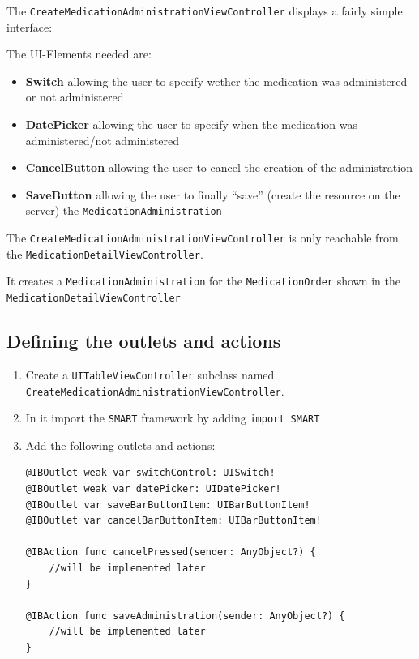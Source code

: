 \documentclass{article}
\begin{document}
The \texttt{CreateMedicationAdministrationViewController} displays a
fairly simple interface:

The UI-Elements needed are:
\begin{itemize}
  \item
    \textbf{Switch} allowing the user to specify wether the medication was administered or not administered
  \item
    \textbf{DatePicker} allowing the user to specify when the medication was administered/not administered
  \item
  \textbf{CancelButton} allowing the user to cancel the creation of the administration
  \item
    \textbf{SaveButton} allowing the user to finally ``save'' (create the resource on the server) the \texttt{MedicationAdministration}
\end{itemize}

The \texttt{CreateMedicationAdministrationViewController} is only
reachable from the \texttt{MedicationDetailViewController}.

It creates a \texttt{MedicationAdministration} for the \texttt{MedicationOrder} shown in the \texttt{MedicationDetailViewController}

\subsection{Defining the outlets and actions}\label{defining-the-outlets-and-actions}

\begin{enumerate}
\item
  Create a \texttt{UITableViewController} subclass named \texttt{CreateMedicationAdministrationViewController}.
\item
  In it import the \texttt{SMART} framework by adding \texttt{import\ SMART}
\item
Add the following outlets and actions:
\begin{verbatim}
@IBOutlet weak var switchControl: UISwitch!
@IBOutlet weak var datePicker: UIDatePicker!
@IBOutlet var saveBarButtonItem: UIBarButtonItem!
@IBOutlet var cancelBarButtonItem: UIBarButtonItem!

@IBAction func cancelPressed(sender: AnyObject?) {
    //will be implemented later
}

@IBAction func saveAdministration(sender: AnyObject?) {
    //will be implemented later
}
\end{verbatim}

\end{enumerate}
\end{document}
